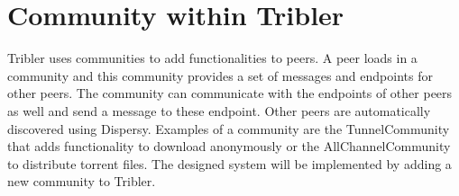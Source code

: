 \section{Community within Tribler}
Tribler uses communities to add functionalities to peers.
A peer loads in a community and this community provides a set of messages and endpoints for other peers.
The community can communicate with the endpoints of other peers as well and send a message to these endpoint.
Other peers are automatically discovered using Dispersy.
Examples of a community are the TunnelCommunity that adds functionality to download anonymously\cite{Plak-anonymous}
or the AllChannelCommunity to distribute torrent files.
The designed system will be implemented by adding a new community to Tribler.